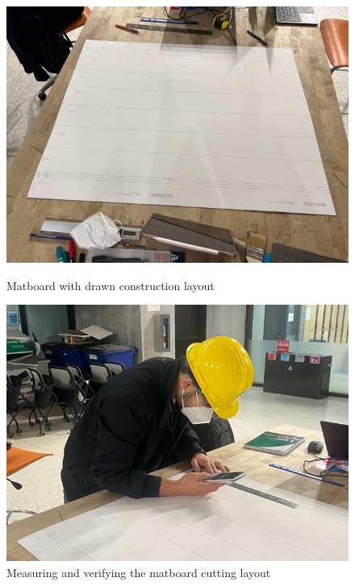 \documentclass[11pt]{article}
\begin{document}
\begin{figure}[h]
    \centering
    \begin{minipage}[t]{.49\textwidth}
        \centering
        \includegraphics[width=\textwidth]{img/construction_4.jpg}
        \caption{Matboard with drawn construction layout}
        \label{c4}
    \end{minipage}
    \hfill
    \begin{minipage}[t]{.49\textwidth}
        \centering
        \includegraphics[width=\textwidth]{img/construction_5.jpg}
        \caption{Measuring and verifying the matboard cutting layout}
        \label{c5}
    \end{minipage}
\end{figure}
\end{document}
